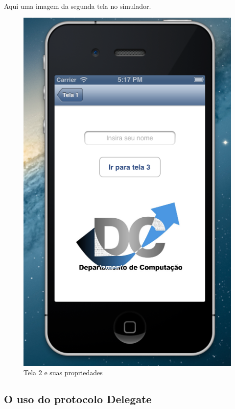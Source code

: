 \documentclass[a4paper,12pt,brazil,doubleside]{book}
\begin{document}
\paragraph{}Aqui uma imagem da segunda tela no simulador.\\

\begin{figure}[h]
  \centering
  \includegraphics[totalheight=0.4\textheight]{../figuras/ios/2/simulador2_tela2.png}
  \caption{Tela 2 e suas propriedades}
  \label{fig:a}
\end{figure}

\bigskip
\bigskip

\subsection{O uso do protocolo Delegate}
\end{document}
